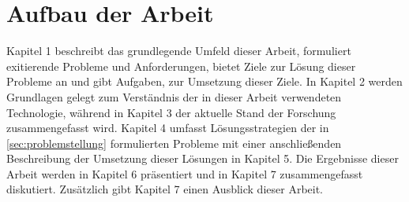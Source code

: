 \section{Aufbau der Arbeit}
Kapitel 1 beschreibt das grundlegende Umfeld dieser Arbeit, formuliert exitierende Probleme und Anforderungen, bietet Ziele zur Lösung dieser Probleme an und gibt Aufgaben, zur Umsetzung dieser Ziele. 
In Kapitel 2 werden Grundlagen gelegt zum Verständnis der in dieser Arbeit verwendeten Technologie, während in Kapitel 3 der aktuelle Stand der Forschung zusammengefasst wird. 
Kapitel 4 umfasst Lösungsstrategien der in \ref{sec:problemstellung} formulierten Probleme mit einer anschließenden Beschreibung der Umsetzung dieser Lösungen in Kapitel 5. 
Die Ergebnisse dieser Arbeit werden in Kapitel 6 präsentiert und in Kapitel 7 zusammengefasst diskutiert. Zusätzlich gibt Kapitel 7 einen Ausblick dieser Arbeit.